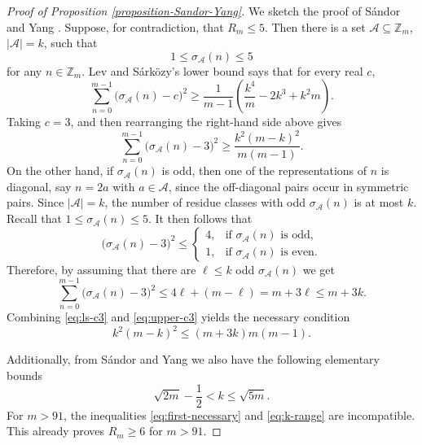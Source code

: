 \documentclass[12pt,a4paper,reqno]{amsart}
\numberwithin{equation}{section}
\def\Z{{\mathbb Z}}
\newcommand{\card}[1]{\left|#1\right|}
\theoremstyle{plain}
\theoremstyle{definition}
\begin{document}
\begin{proof}[Proof of Proposition \ref{proposition-Sandor-Yang}]
We sketch the proof of S\'andor and Yang \cite[Theorem 1.2]{SY17}.
Suppose, for contradiction, that \(R_m\le 5\).  Then there is a set
\(\mathcal{A}\subseteq \Z_m\), \(\card{\mathcal{A}}=k\), such that
\[
1\le \sigma_{\mathcal{A}}(n)\le 5
\]
for any $n\in \Z_m$.
Lev and S\'ark\"ozy's lower bound says that for every real \(c\),
\[
\sum_{n=0}^{m-1}\big(\sigma_{\mathcal{A}}(n)-c\big)^2
\ge
\frac{1}{m-1}\left(\frac{k^4}{m}-2k^3+k^2m\right).
\]
Taking \(c=3\), and then rearranging the right-hand side above gives
\begin{equation}\label{eq:ls-c3}
\sum_{n=0}^{m-1}\big(\sigma_{\mathcal{A}}(n)-3\big)^2
\ge
\frac{k^2(m-k)^2}{m(m-1)}.
\end{equation}
On the other hand, if \(\sigma_{\mathcal{A}}(n)\) is odd, then one of the representations
of \(n\) is diagonal, say \(n=2a\) with \(a\in \mathcal{A}\), since the
off-diagonal pairs occur in symmetric pairs. Since $|\mathcal{A}|=k$, the number of
residue classes with odd \(\sigma_{\mathcal{A}}(n)\) is at most \(k\).  Recall that
\(1\le \sigma_{\mathcal{A}}(n)\le 5\). It then follows that
\[
\big(\sigma_{\mathcal{A}}(n)-3\big)^2\le
\begin{cases}
4,& \text{if } \sigma_{\mathcal{A}}(n)\text{ is odd},\\
1,& \text{if }  \sigma_{\mathcal{A}}(n)\text{ is even}.
\end{cases}
\]
Therefore, by assuming that there are $\ell\le k$ odd $\sigma_{\mathcal{A}}(n)$ we get
\begin{equation}\label{eq:upper-c3}
\sum_{n=0}^{m-1}\big(\sigma_{\mathcal{A}}(n)-3\big)^2\le 4\ell+ (m-\ell) =m+3\ell\le m+3k.
\end{equation}
Combining \eqref{eq:ls-c3} and \eqref{eq:upper-c3} yields the necessary
condition
\begin{equation}\label{eq:first-necessary}
k^2(m-k)^2\le (m+3k)m(m-1).
\end{equation}

Additionally, from S\'andor and Yang \cite[Lemmas 2.2 and 2.3]{SY17} we also have the following elementary bounds
\begin{equation}\label{eq:k-range}
\sqrt{2m}-\frac12<k\le \sqrt{5m}.
\end{equation}
For \(m>91\), the inequalities \eqref{eq:first-necessary} and
\eqref{eq:k-range} are incompatible.  This already proves
\(R_m\ge 6\) for \(m>91\).


\end{proof}
\end{document}
